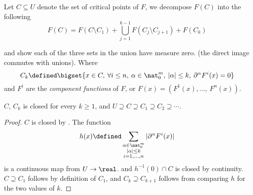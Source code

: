 \documentclass[../main-v2-manifolds.tex]{subfiles}
\begin{document}
Let $C\subseteq U$ denote the set of critical points of $F$, we decompose $F(C)$ into the following
\begin{equation}\label{lee-sards-decompose-C}
    F(C) = F(C\setminus C_1) + \bigcup_{j=1}^{k-1} F(C_j\setminus C_{j+1}) + F(C_k)
\end{equation}
    
and show each of the three sets in the union have measure zero. (the direct image commutes with unions). Where
\[
    C_k \defined\bigset{x\in C,\: \forall i\leq n,\:\alpha\in\nat_0^m,\:|\alpha|\leq k,\: \partial^\alpha F^i(x)=0}
\]
and $F^i$ are the \emph{component functions} of $F$, or $F(x) = (F^{1}(x),\ldots,\: F^{n}(x))$.


\begin{step}[Properties of $C$, $C_k$]
    $C$, $C_k$ is closed for every $k\geq 1$, and 
    $
    U\supseteq C\supseteq C_1\supseteq C_2\supseteq \cdots
    $.
\end{step}
\begin{proof}
    $C$ is closed by . The function 
    \[
        h(x)\defined \sum_{{\substack{\alpha\in\nat_0^m\\ |\alpha|\leq k\\ i=1,\ldots,n}}}|\partial^\alpha F^i(x)|
    \]
    is a continuous map from $U\to\real$. and $h^{-1}(0)\cap C$ is closed by continuity. $C\supseteq C_1$ follows by definition of $C_1$, and $C_k\supseteq C_{k+1}$ follows from comparing $h$ for the two values of $k$.
\end{proof}
\end{document}

